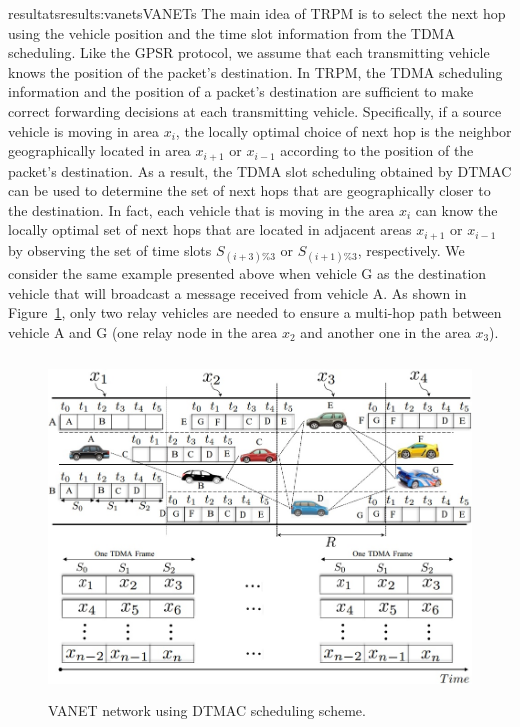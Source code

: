 \documentclass{ra2016}
\begin{document}
\begin{module}{resultats}{results:vanets}{VANETs}
The main idea of TRPM is to select the next hop using the vehicle position and the time 
slot information from the TDMA scheduling.  Like the GPSR protocol, we assume that each transmitting vehicle 
knows the position of the packet's destination. In TRPM, the TDMA scheduling information and the position of a packet's destination 
are sufficient to make correct forwarding decisions at each transmitting vehicle. Specifically, if a  source vehicle is moving in 
area $x_i$, the locally optimal choice of next hop is the neighbor geographically located in area $x_{i+1}$ or $x_{i-1}$ according 
to the position of the packet's destination. As a result, the TDMA slot scheduling obtained by DTMAC  can be used to determine the 
set of next hops that are geographically closer to the destination. In fact, each vehicle that is moving in the area $x_i$ can 
know the locally optimal set of next hops that are located in adjacent areas $x_{i+1}$ or $x_{i-1}$ by observing the set of time 
slots $S_{(i+3)\%3}$ or $S_{(i+1)\%3}$, respectively. We consider the same example presented above when vehicle G as the destination 
vehicle that will broadcast a message received from vehicle A. As shown in Figure~\ref{figc:trpm}, only two relay vehicles are needed to ensure a 
multi-hop path between vehicle A and G (one relay node in the area $x_2$ and another one in the area $x_3$). 


\begin{figure}[!htbp]
  \begin{center}
 \includegraphics[height=9cm,width=15cm]{IMG/TRPM.jpg}
 
  \caption{VANET network using DTMAC scheduling scheme.}
 \label{figc:trpm}
  \end{center}
\end{figure}


\end{module}
\end{document}
